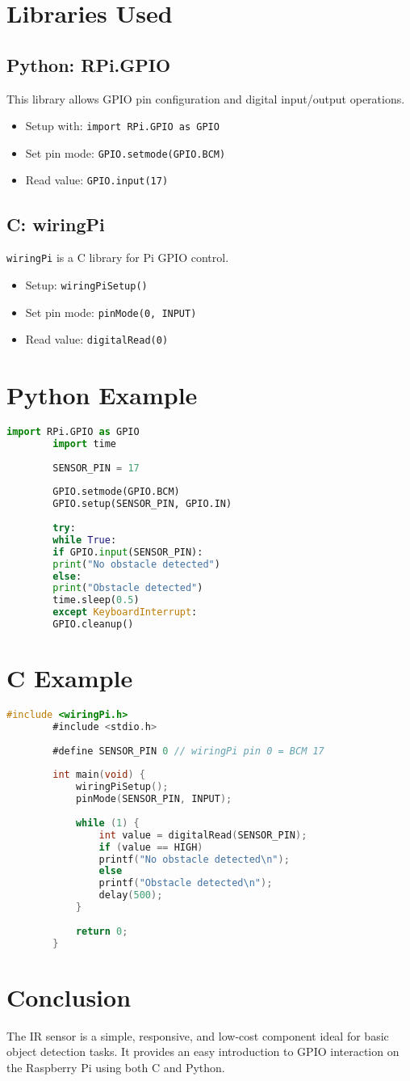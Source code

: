 \documentclass{article}
\begin{document}
	\section{Libraries Used}
	\subsection*{Python: RPi.GPIO}
	This library allows GPIO pin configuration and digital input/output operations.
	\begin{itemize}
		\item Setup with: \texttt{import RPi.GPIO as GPIO}
		\item Set pin mode: \texttt{GPIO.setmode(GPIO.BCM)}
		\item Read value: \texttt{GPIO.input(17)}
	\end{itemize}
	
	\subsection*{C: wiringPi}
	\texttt{wiringPi} is a C library for Pi GPIO control.
	\begin{itemize}
		\item Setup: \texttt{wiringPiSetup()}
		\item Set pin mode: \texttt{pinMode(0, INPUT)}
		\item Read value: \texttt{digitalRead(0)}
	\end{itemize}
	
	\section{Python Example}
	\begin{lstlisting}[language=Python]
		import RPi.GPIO as GPIO
		import time
		
		SENSOR_PIN = 17
		
		GPIO.setmode(GPIO.BCM)
		GPIO.setup(SENSOR_PIN, GPIO.IN)
		
		try:
		while True:
		if GPIO.input(SENSOR_PIN):
		print("No obstacle detected")
		else:
		print("Obstacle detected")
		time.sleep(0.5)
		except KeyboardInterrupt:
		GPIO.cleanup()
	\end{lstlisting}
	
	\section{C Example}
	\begin{lstlisting}[language=C]
		#include <wiringPi.h>
		#include <stdio.h>
		
		#define SENSOR_PIN 0 // wiringPi pin 0 = BCM 17
		
		int main(void) {
			wiringPiSetup();
			pinMode(SENSOR_PIN, INPUT);
			
			while (1) {
				int value = digitalRead(SENSOR_PIN);
				if (value == HIGH)
				printf("No obstacle detected\n");
				else
				printf("Obstacle detected\n");
				delay(500);
			}
			
			return 0;
		}
	\end{lstlisting}
	
	\section{Conclusion}
	The IR sensor is a simple, responsive, and low-cost component ideal for basic object detection tasks. It provides an easy introduction to GPIO interaction on the Raspberry Pi using both C and Python.
	
\end{document}
